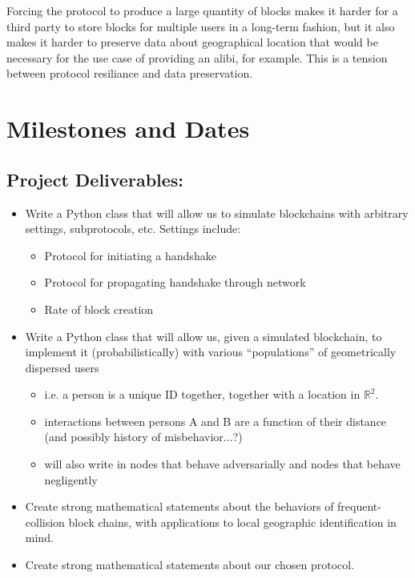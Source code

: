 \documentclass{article}
\begin{document}
Forcing the protocol to produce a large quantity of blocks
makes it harder for a third party to store blocks for multiple users in a long-term fashion,
but it also makes it harder to preserve data about geographical location
that would be necessary for the use case of providing an alibi, for example.
This is a tension between protocol resiliance and data preservation.

\section*{Milestones and Dates}
\subsection*{Project Deliverables:}
\begin{itemize}
	\item Write a Python class that will allow us to simulate
		blockchains with arbitrary settings, subprotocols, etc.
		Settings include:
	\begin{itemize}
		\item Protocol for initiating a handshake
		\item Protocol for propagating handshake through network
		\item Rate of block creation
	\end{itemize}
	\item Write a Python class that will allow us, given a simulated
		blockchain, to implement it (probabilistically) with
		various ``populations'' of geometrically dispersed users
	\begin{itemize}
		\item i.e. a person is a unique ID together,
			together with a location in $\mathbb{R}^2$.
		\item interactions between persons A and B are
			a function of their distance (and possibly
			history of misbehavior...?)
		\item will also write in nodes that behave adversarially
			and nodes that behave negligently
	\end{itemize}
	\item Create strong mathematical statements about
		the behaviors of frequent-collision block chains,
		with applications to local geographic identification
		in mind.
	\item Create strong mathematical statements about our chosen
		protocol.
\end{itemize}
\end{document}
